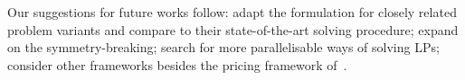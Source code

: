 \documentclass[smallextended]{svjour3}       %
\begin{document}
Our suggestions for future works follow: adapt the formulation for closely related problem variants and compare to their state-of-the-art solving procedure; expand on the symmetry-breaking; search for more parallelisable ways of solving LPs; consider other frameworks besides the pricing framework of~\cite{furini:2016}.


%
%
%
\end{document}
